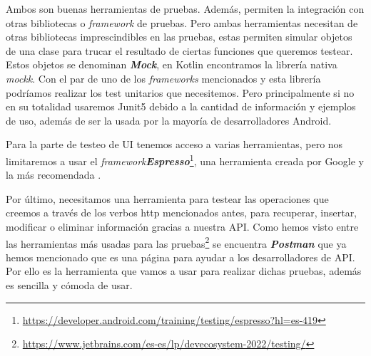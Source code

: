 Ambos son buenas herramientas de pruebas. Además, permiten la integración con otras bibliotecas o 
\textit{framework} de pruebas. Pero ambas herramientas necesitan de otras bibliotecas imprescindibles 
en las pruebas, estas permiten simular objetos de una clase para trucar el resultado de ciertas 
funciones que queremos testear. Estos objetos se denominan \textbf{\textit{Mock}}, en Kotlin 
encontramos la librería nativa \textit{mockk}. Con el par de uno de los \textit{frameworks} mencionados 
y esta librería podríamos realizar los test unitarios que necesitemos. Pero principalmente si no en su 
totalidad usaremos Junit5 debido a la cantidad de información y ejemplos de uso, además de ser la usada 
por la mayoría de desarrolladores Android.

Para la parte de testeo de UI tenemos acceso a varias herramientas, pero nos limitaremos a usar el 
\textit{framework}\textbf{\textit{Espresso}}\footnote{\url{https://developer.android.com/training/testing/espresso?hl=es-419}}, una herramienta creada por Google y la más recomendada \cite{UITest}.

Por último, necesitamos una herramienta para testear las operaciones que creemos a través de los verbos 
http mencionados antes, para  recuperar, insertar, modificar o eliminar información gracias a nuestra 
API. Como hemos visto entre las herramientas más usadas para las 
pruebas\footnote{\url{https://www.jetbrains.com/es-es/lp/devecosystem-2022/testing/}} se encuentra 
\textit{\textbf{Postman}} que ya hemos mencionado que es una página para ayudar a los desarrolladores 
de API. Por ello es la herramienta que vamos a usar para realizar dichas pruebas, además es sencilla y 
cómoda de usar.





